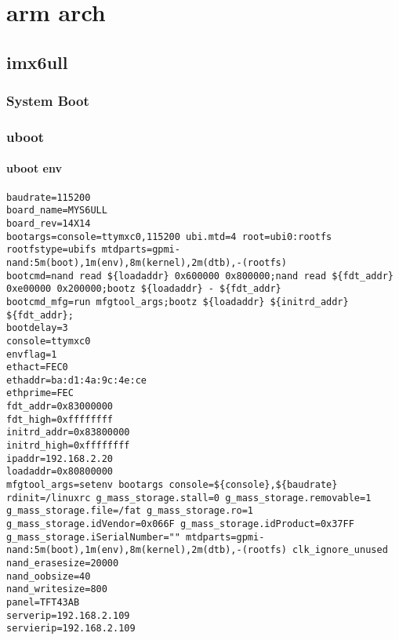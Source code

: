 
\part{arm arch}


\chapter{imx6ull}


\section{System Boot}



\section{uboot}



\subsection{uboot env}
\begin{lstlisting}
baudrate=115200
board_name=MYS6ULL
board_rev=14X14
bootargs=console=ttymxc0,115200 ubi.mtd=4 root=ubi0:rootfs rootfstype=ubifs mtdparts=gpmi-nand:5m(boot),1m(env),8m(kernel),2m(dtb),-(rootfs)
bootcmd=nand read ${loadaddr} 0x600000 0x800000;nand read ${fdt_addr} 0xe00000 0x200000;bootz ${loadaddr} - ${fdt_addr}
bootcmd_mfg=run mfgtool_args;bootz ${loadaddr} ${initrd_addr} ${fdt_addr};
bootdelay=3
console=ttymxc0
envflag=1
ethact=FEC0
ethaddr=ba:d1:4a:9c:4e:ce
ethprime=FEC
fdt_addr=0x83000000
fdt_high=0xffffffff
initrd_addr=0x83800000
initrd_high=0xffffffff
ipaddr=192.168.2.20
loadaddr=0x80800000
mfgtool_args=setenv bootargs console=${console},${baudrate} rdinit=/linuxrc g_mass_storage.stall=0 g_mass_storage.removable=1 g_mass_storage.file=/fat g_mass_storage.ro=1 g_mass_storage.idVendor=0x066F g_mass_storage.idProduct=0x37FF g_mass_storage.iSerialNumber="" mtdparts=gpmi-nand:5m(boot),1m(env),8m(kernel),2m(dtb),-(rootfs) clk_ignore_unused
nand_erasesize=20000
nand_oobsize=40
nand_writesize=800
panel=TFT43AB
serverip=192.168.2.109
servierip=192.168.2.109

\end{lstlisting}

